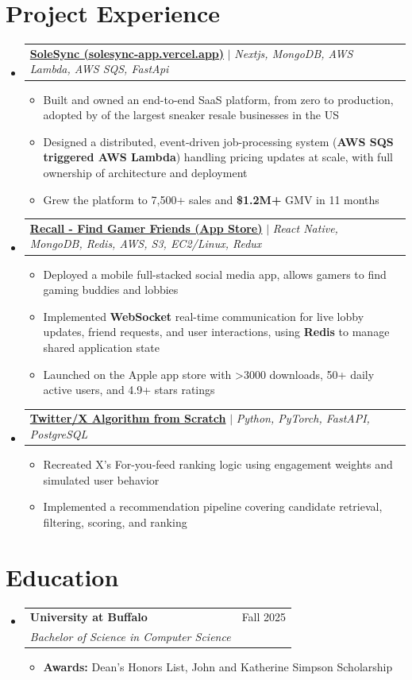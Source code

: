 \documentclass[letterpaper,11pt]{article}
\makeatletter
\newcommand{\resumeItem}[1]{
  \item\small{
    {#1 \vspace{-3pt}}
  }
}
\newcommand{\resumeSubheading}[4]{
  \vspace{-2pt}\item
    \begin{tabular*}{0.97\textwidth}[t]{l@{\extracolsep{\fill}}r}
      \textbf{#1} & #2 \\
      \textit{\small#3} & \textit{\small #4} \\
    \end{tabular*}\vspace{-7pt}
}
\newcommand{\resumeProjectHeading}[2]{
    \item
    \begin{tabular*}{0.97\textwidth}{l@{\extracolsep{\fill}}r}
      \small#1 & #2 \\
    \end{tabular*}\vspace{-7pt}
}
\newcommand{\resumeSubHeadingListStart}{\begin{itemize}[leftmargin=0.15in, label={}]}
\newcommand{\resumeSubHeadingListEnd}{\end{itemize}}
\newcommand{\resumeItemListStart}{\begin{itemize}}
\newcommand{\resumeItemListEnd}{\end{itemize}\vspace{-5pt}}
\makeatother
\begin{document}
\section{Project Experience}

    \resumeSubHeadingListStart
      \resumeProjectHeading
          {\href{}{\textbf{SoleSync (solesync-app.vercel.app)}} $|$ \emph{Nextjs, MongoDB, AWS Lambda, AWS SQS, FastApi}}{}
          \resumeItemListStart
            \resumeItem{Built and owned an end-to-end SaaS platform, from zero to production, adopted by \3 of the largest sneaker resale businesses in the US}
            \resumeItem{Designed a distributed, event-driven job-processing system (\textbf{AWS SQS triggered AWS Lambda}) handling pricing updates at scale, with full ownership of architecture and deployment}
            \resumeItem{Grew the platform to 7,500+ sales and \textbf{\$1.2M+} GMV in 11 months}
          \resumeItemListEnd
    \resumeSubHeadingListEnd

    \resumeSubHeadingListStart
      \resumeProjectHeading
          {\href{}{\textbf{Recall - Find Gamer Friends (App Store)}} $|$ \emph{React Native, MongoDB, Redis, AWS, S3, EC2/Linux, Redux}}{}
          \resumeItemListStart
            \resumeItem{Deployed a mobile full-stacked social media app, allows gamers to find gaming buddies and lobbies}
            \resumeItem{Implemented \textbf{WebSocket} real-time communication for live lobby updates, friend requests, and user interactions, using \textbf{Redis} to manage shared application state}
            \resumeItem{Launched on the Apple app store with \textgreater 3000 downloads, 50+ daily active users, and 4.9+ stars ratings}
          \resumeItemListEnd
    \resumeSubHeadingListEnd
    
    \resumeSubHeadingListStart
        \resumeProjectHeading
        {\href{}{\textbf{Twitter/X Algorithm from Scratch}} $|$ \emph{Python, PyTorch, FastAPI, PostgreSQL}}{}
        \resumeItemListStart
        \resumeItem{Recreated X’s For-you-feed ranking logic using engagement weights and simulated user behavior}
        \resumeItem{Implemented a recommendation pipeline covering candidate retrieval, filtering, scoring, and ranking}
        \resumeItemListEnd
    \resumeSubHeadingListEnd





\section{Education}
  \resumeSubHeadingListStart
    \resumeSubheading
        {University at Buffalo}{Fall 2025}
        {Bachelor of Science in Computer Science}{}
        \resumeItemListStart
        \resumeItem{\textbf{Awards:} Dean’s Honors List, John and Katherine Simpson Scholarship}
        \resumeItemListEnd
  \resumeSubHeadingListEnd
\end{document}
